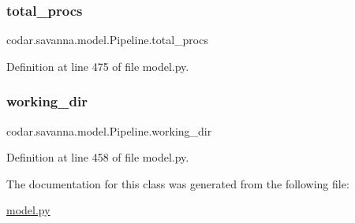 \subsubsection{\texorpdfstring{total\+\_\+procs}{total\_procs}}
{\footnotesize\ttfamily codar.\+savanna.\+model.\+Pipeline.\+total\+\_\+procs}



Definition at line 475 of file model.\+py.

\mbox{\label{classcodar_1_1savanna_1_1model_1_1_pipeline_a2272c691cd2ecb1b11b581341cd5707c}} 
\subsubsection{\texorpdfstring{working\+\_\+dir}{working\_dir}}
{\footnotesize\ttfamily codar.\+savanna.\+model.\+Pipeline.\+working\+\_\+dir}



Definition at line 458 of file model.\+py.



The documentation for this class was generated from the following file\+:\begin{DoxyCompactItemize}
\item 
\hyperlink{model_8py}{model.\+py}\end{DoxyCompactItemize}

